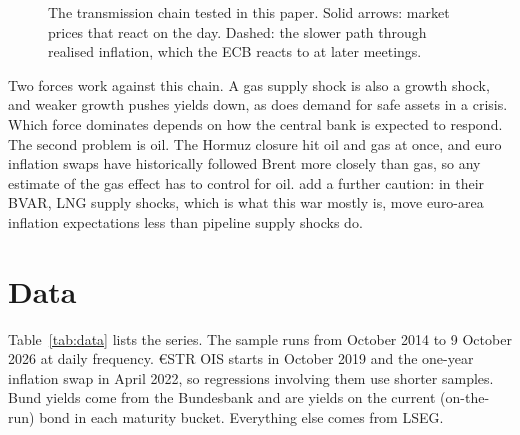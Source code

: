 \documentclass[11pt,a4paper]{article}
\begin{document}
\begin{figure}[htbp]\centering
{}
\caption{The transmission chain tested in this paper. Solid arrows: market prices that react on the day. Dashed: the
slower path through realised inflation, which the ECB reacts to at later meetings.}\label{fig:chain}
\end{figure}

Two forces work against this chain. A gas supply shock is also a growth shock, and weaker growth pushes yields down,
as does demand for safe assets in a crisis. Which force dominates depends on how the central bank is expected to
respond. The second problem is oil. The Hormuz closure hit oil and gas at once, and euro inflation swaps have
historically followed Brent more closely than gas, so any estimate of the gas effect has to control for oil.
\citet{adolfsen2026} add a further caution: in their BVAR, LNG supply shocks, which is what this war mostly is, move
euro-area inflation expectations less than pipeline supply shocks do.

\section{Data}\label{sec:data}

Table~\ref{tab:data} lists the series. The sample runs from October 2014 to 9 October 2026 at daily frequency.
\euro{}STR OIS starts in October 2019 and the one-year inflation swap in April 2022, so regressions involving them use
shorter samples. Bund yields come from the Bundesbank and are yields on the current (on-the-run) bond in each maturity
bucket. Everything else comes from LSEG.
\end{document}
